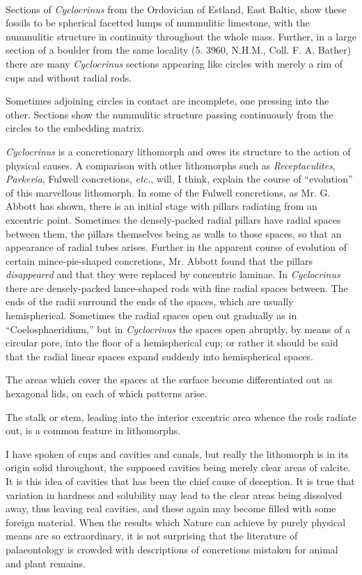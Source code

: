 \documentclass[a4paper, 12pt, oneside]{article}
\begin{document}
\paragraph{}
Sections of \emph{Cyclocrinus} from the Ordovician of Estland, East Baltic, show these fossils to be spherical facetted lumps of nummulitic limestone, with the nummulitic structure in continuity throughout the whole mass. Further, in a large section of a boulder from the same locality (5. 3960, N.H.M., Coll. F. A. Bather) there are many \emph{Cyclocrinus} sections appearing like circles with merely a rim of cups and without radial rods.

Sometimes adjoining circles in contact are incomplete, one pressing into the other. Sections show the nummulitic structure passing continuously from the circles to the embedding matrix.

\emph{Cyclocrinus} is a concretionary lithomorph and owes its structure to the action of physical causes. A comparison with other lithomorphs such as \emph{Receptaculites}, \emph{Parkeria}, Fulwell concretions, \emph{etc.}, will, I think, explain the course of ``evolution'' of this marvellous lithomorph. In some of the Fulwell concretions, as Mr. G. Abbott has shown, there is an initial stage with pillars radiating from an excentric point. Sometimes the densely-packed radial pillars have radial spaces between them, the pillars themselves being as walls to those spaces, so that an appearance of radial tubes arises. Further in the apparent course of evolution of certain mince-pie-shaped concretions, Mr. Abbott found that the pillars \emph{disappeared} and that they were replaced by concentric laminae. In \emph{Cyclocrinus} there are densely-packed lance-shaped rods with fine radial spaces between. The ends of the radii surround the ends of the spaces, which are usually hemispherical. Sometimes the radial spaces open out gradually as in ``Coelosphaeridium,'' but in \emph{Cyclocrinus} the spaces open abruptly, by means of a circular pore, into the floor of a hemispherical cup; or rather it should be said that the radial linear spaces expand suddenly into hemispherical spaces.

The areas which cover the spaces at the surface become differentiated out as hexagonal lids, on each of which patterns arise.

The stalk or stem, leading into the interior excentric area whence the rods radiate out, is a common feature in lithomorphs.

I have spoken of cups and cavities and canals, but really the lithomorph is in its origin solid throughout, the supposed cavities being merely clear areas of calcite. It is this idea of cavities that has been the chief cause of deception. It is true that variation in hardness and solubility may lead to the clear areas being dissolved away, thus leaving real cavities, and these again may become filled with some foreign material. When the results which Nature can achieve by purely physical means are so extraordinary, it is not surprising that the literature of palaeontology is crowded with descriptions of concretions mistaken for animal and plant remains.
\end{document}
